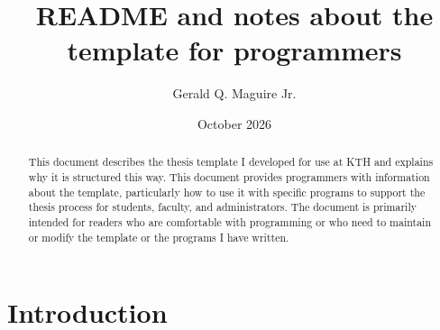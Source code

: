 \documentclass[12pt, twoside]{article}
\title{README and notes about the template for programmers}
\author{Gerald Q. Maguire Jr.}
\date{October 2026}
\renewcommand{\sectionmark}[1]{%
\markboth{#1}{}}
\begin{document}
\glsresetall
\maketitle
{}

\begin{abstract}
This document describes the thesis template I developed for use at \gls{KTH} and explains why it is structured this way. This document provides programmers with information about the template, particularly how to use it with specific programs to support the thesis process for students, faculty, and administrators. The document is primarily intended for readers who are comfortable with programming or who need to maintain or modify the template or the programs I have written.

\end{abstract}
\cleardoublepage


\renewcommand{\sectionmark}[1]{ \markboth{#1}{}}
\tableofcontents
\markboth{\contentsname}{}
\cleardoublepage
 
\setcounter{page}{1}
\glsresetall
\section{Introduction}
\label{sec:IntroForProgrammers}
\end{document}
